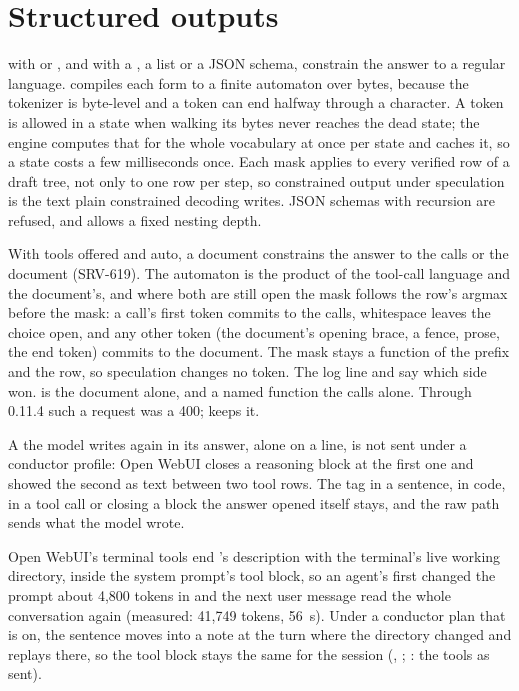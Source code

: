 \section{Structured outputs}

 with  or , and  with a , a  list or a JSON schema, constrain the answer to a regular language.  compiles each form to a finite automaton over bytes, because the tokenizer is byte-level and a token can end halfway through a character. A token is allowed in a state when walking its bytes never reaches the dead state; the engine computes that for the whole vocabulary at once per state and caches it, so a state costs a few milliseconds once. Each mask applies to every verified row of a draft tree, not only to one row per step, so constrained output under speculation is the text plain constrained decoding writes. JSON schemas with recursion are refused, and  allows a fixed nesting depth.

With tools offered and  auto, a document constrains the answer to the calls or the document (SRV-619). The automaton is the product of the tool-call language and the document's, and where both are still open the mask follows the row's argmax before the mask: a call's first token commits to the calls, whitespace leaves the choice open, and any other token (the document's opening brace, a fence, prose, the end token) commits to the document. The mask stays a function of the prefix and the row, so speculation changes no token. The log line  and  say which side won.  is the document alone,  and a named function the calls alone. Through 0.11.4 such a request was a 400;  keeps it.

A  the model writes again in its answer, alone on a line, is not sent under a conductor profile: Open WebUI closes a reasoning block at the first one and showed the second as text between two tool rows. The tag in a sentence, in code, in a tool call or closing a block the answer opened itself stays, and the raw path sends what the model wrote.

Open WebUI's terminal tools end 's description with the terminal's live working directory, inside the system prompt's tool block, so an agent's first  changed the prompt about 4,800 tokens in and the next user message read the whole conversation again (measured: 41,749 tokens, 56~s). Under a conductor plan that is on, the sentence moves into a note at the turn where the directory changed and replays there, so the tool block stays the same for the session (, ; : the tools as sent).

